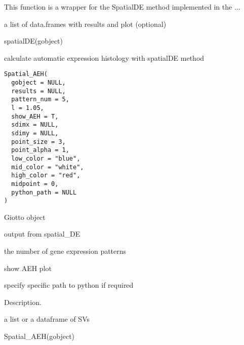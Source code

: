 \documentclass[a4paper]{book}
\begin{document}
%
\begin{Details}\relax
This function is a wrapper for the SpatialDE method implemented in the ...
\end{Details}
%
\begin{Value}
a list of data.frames with results and plot (optional)
\end{Value}
%
\begin{Examples}
\begin{ExampleCode}
    spatialDE(gobject)
\end{ExampleCode}
\end{Examples}
%
\begin{Description}\relax
calculate automatic expression histology with spatialDE method
\end{Description}
%
\begin{Usage}
\begin{verbatim}
Spatial_AEH(
  gobject = NULL,
  results = NULL,
  pattern_num = 5,
  l = 1.05,
  show_AEH = T,
  sdimx = NULL,
  sdimy = NULL,
  point_size = 3,
  point_alpha = 1,
  low_color = "blue",
  mid_color = "white",
  high_color = "red",
  midpoint = 0,
  python_path = NULL
)
\end{verbatim}
\end{Usage}
%
\begin{Arguments}
\begin{ldescription}
\item[\code{gobject}] Giotto object

\item[\code{results}] output from spatial\_DE

\item[\code{pattern\_num}] the number of gene expression patterns

\item[\code{show\_AEH}] show AEH plot

\item[\code{python\_path}] specify specific path to python if required
\end{ldescription}
\end{Arguments}
%
\begin{Details}\relax
Description.
\end{Details}
%
\begin{Value}
a list or a dataframe of SVs
\end{Value}
%
\begin{Examples}
\begin{ExampleCode}
    Spatial_AEH(gobject)
\end{ExampleCode}
\end{Examples}
\end{document}
